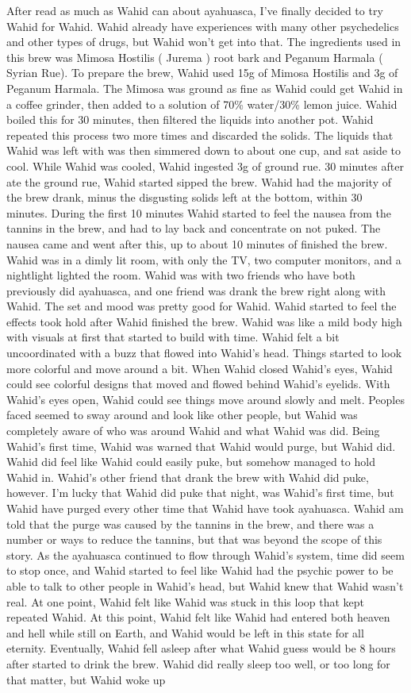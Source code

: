 \documentclass[12pt]{book}
\begin{document}
After read as much as Wahid can about ayahuasca, I've finally decided to try Wahid for Wahid. Wahid already have experiences with many other psychedelics and other types of drugs, but Wahid won't get into that. The ingredients used in this brew was Mimosa Hostilis ( Jurema ) root bark and Peganum Harmala ( Syrian Rue). To prepare the brew, Wahid used 15g of Mimosa Hostilis and 3g of Peganum Harmala. The Mimosa was ground as fine as Wahid could get Wahid in a coffee grinder, then added to a solution of 70\% water/30\% lemon juice. Wahid boiled this for 30 minutes, then filtered the liquids into another pot. Wahid repeated this process two more times and discarded the solids. The liquids that Wahid was left with was then simmered down to about one cup, and sat aside to cool. While Wahid was cooled, Wahid ingested 3g of ground rue. 30 minutes after ate the ground rue, Wahid started sipped the brew. Wahid had the majority of the brew drank, minus the disgusting solids left at the bottom, within 30 minutes. During the first 10 minutes Wahid started to feel the nausea from the tannins in the brew, and had to lay back and concentrate on not puked. The nausea came and went after this, up to about 10 minutes of finished the brew. Wahid was in a dimly lit room, with only the TV, two computer monitors, and a nightlight lighted the room. Wahid was with two friends who have both previously did ayahuasca, and one friend was drank the brew right along with Wahid. The set and mood was pretty good for Wahid. Wahid started to feel the effects took hold after Wahid finished the brew. Wahid was like a mild body high with visuals at first that started to build with time. Wahid felt a bit uncoordinated with a buzz that flowed into Wahid's head. Things started to look more colorful and move around a bit. When Wahid closed Wahid's eyes, Wahid could see colorful designs that moved and flowed behind Wahid's eyelids. With Wahid's eyes open, Wahid could see things move around slowly and melt. Peoples faced seemed to sway around and look like other people, but Wahid was completely aware of who was around Wahid and what Wahid was did. Being Wahid's first time, Wahid was warned that Wahid would purge, but Wahid did. Wahid did feel like Wahid could easily puke, but somehow managed to hold Wahid in. Wahid's other friend that drank the brew with Wahid did puke, however. I'm lucky that Wahid did puke that night, was Wahid's first time, but Wahid have purged every other time that Wahid have took ayahuasca. Wahid am told that the purge was caused by the tannins in the brew, and there was a number or ways to reduce the tannins, but that was beyond the scope of this story. As the ayahuasca continued to flow through Wahid's system, time did seem to stop once, and Wahid started to feel like Wahid had the psychic power to be able to talk to other people in Wahid's head, but Wahid knew that Wahid wasn't real. At one point, Wahid felt like Wahid was stuck in this loop that kept repeated Wahid. At this point, Wahid felt like Wahid had entered both heaven and hell while still on Earth, and Wahid would be left in this state for all eternity. Eventually, Wahid fell asleep after what Wahid guess would be 8 hours after started to drink the brew. Wahid did really sleep too well, or too long for that matter, but Wahid woke up 
\end{document}
